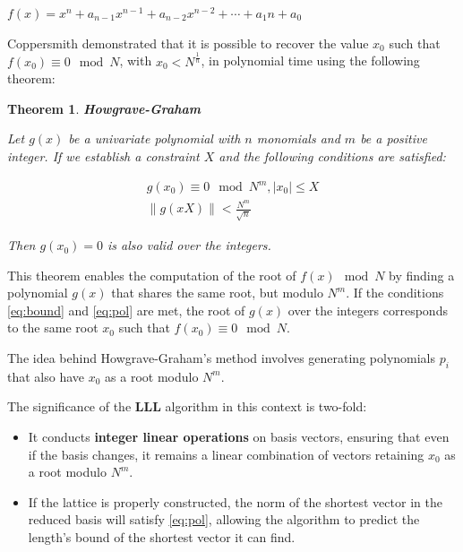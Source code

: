 \documentclass[a4paper,12pt]{report}
\newtheorem{theorem}{Theorem}[section]
\begin{document}
\begin{center}
    $f(x) = x^n + a_{n-1}x^{n-1} + a_{n-2}x^{n-2} + \cdots + a_1n + a_0$
\end{center}

Coppersmith demonstrated that it is possible to recover the value $x_0$ such that $f(x_0) \equiv 0 \mod N$, with $x_0 < N^{\frac{1}{n}}$, in polynomial time using the following theorem:

\clearpage

\begin{theorem}
    \textbf{Howgrave-Graham}
\end{theorem}

\textit{Let $g(x)$ be a univariate polynomial with $n$ monomials and $m$ be a positive integer. If we establish a constraint $X$ and the following conditions are satisfied:}

\begin{center}
    \begin{eqnarray}
        g(x_0) \equiv 0 \mod N^m, |x_0| \le X \label{eq:bound} \\
         \lVert g(xX) \rVert < \frac{N^m}{\sqrt{n}} \label{eq:pol}
    \end{eqnarray}
\end{center}

\textit{Then $g(x_0) = 0$ is also valid over the integers.}

This theorem enables the computation of the root of $f(x) \mod N$ by finding a polynomial $g(x)$ that shares the same root, but modulo $N^m$. If the conditions \ref{eq:bound} and \ref{eq:pol} are met, the root of $g(x)$ over the integers corresponds to the same root $x_0$ such that $f(x_0) \equiv 0 \mod N$.

The idea behind Howgrave-Graham's method involves generating polynomials $p_i$ that also have $x_0$ as a root modulo $N^m$.

The significance of the \textbf{LLL} algorithm in this context is two-fold:

\begin{itemize}
    \item It conducts \textbf{integer linear operations} on basis vectors, ensuring that even if the basis changes, it remains a linear combination of vectors retaining $x_0$ as a root modulo $N^m$.
    \item If the lattice is properly constructed, the norm of the shortest vector in the reduced basis will satisfy \ref{eq:pol}, allowing the algorithm to predict the length's bound of the shortest vector it can find.
\end{itemize}
\end{document}

